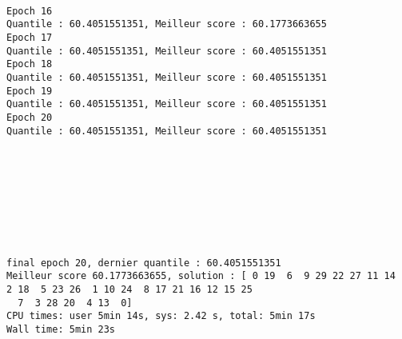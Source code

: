 \documentclass[11pt]{article}
\begin{document}
    \begin{center}
    \end{center}
    { \hspace*{\fill} \\}
    
    \begin{Verbatim}[commandchars=\\\{\}]
Epoch 16
Quantile : 60.4051551351, Meilleur score : 60.1773663655
Epoch 17
Quantile : 60.4051551351, Meilleur score : 60.4051551351
Epoch 18
Quantile : 60.4051551351, Meilleur score : 60.4051551351
Epoch 19
Quantile : 60.4051551351, Meilleur score : 60.4051551351
Epoch 20
Quantile : 60.4051551351, Meilleur score : 60.4051551351

    \end{Verbatim}

    \begin{center}
    \end{center}
    { \hspace*{\fill} \\}
    
    \begin{center}
    \end{center}
    { \hspace*{\fill} \\}
    
    \begin{center}
    \end{center}
    { \hspace*{\fill} \\}
    
    \begin{center}
    \end{center}
    { \hspace*{\fill} \\}
    
    \begin{Verbatim}[commandchars=\\\{\}]
final epoch 20, dernier quantile : 60.4051551351
Meilleur score 60.1773663655, solution : [ 0 19  6  9 29 22 27 11 14  2 18  5 23 26  1 10 24  8 17 21 16 12 15 25
  7  3 28 20  4 13  0]
CPU times: user 5min 14s, sys: 2.42 s, total: 5min 17s
Wall time: 5min 23s

    \end{Verbatim}
\end{document}
